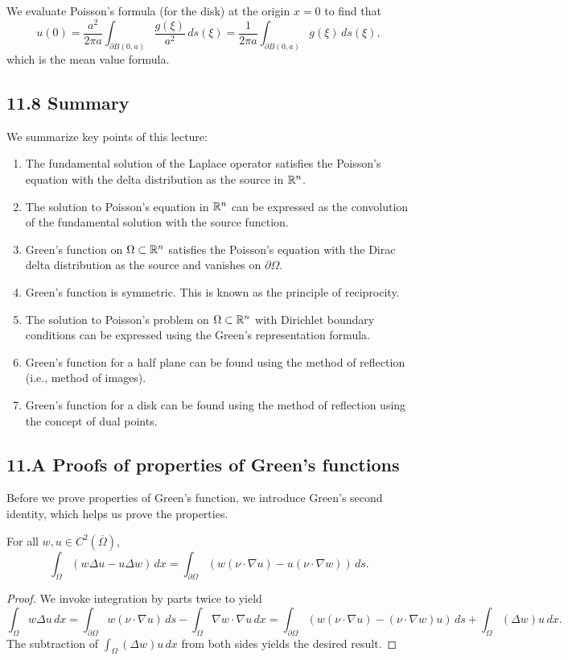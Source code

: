 \begin{example}
    We evaluate Poisson's formula (for the disk) at the origin $x = 0$ to find that
    \[u(0) = \frac{a^2}{2\pi a}\int_{\partial B(0, a)} \frac{g(\xi)}{a^2}\,ds(\xi) = \frac{1}{2\pi a}\int_{\partial B(0, a)} g(\xi)\,ds(\xi),\]
    which is the mean value formula.
\end{example}

\subsection{11.8 Summary}
We summarize key points of this lecture:
\begin{enumerate}
    \item The fundamental solution of the Laplace operator satisfies the Poisson's equation with the delta distribution as the source in $\mathbb{R}^n$.
    \item The solution to Poisson's equation in $\mathbb{R}^n$ can be expressed as the convolution of the fundamental solution with the source function.
    \item Green's function on $\Omega \subset \mathbb{R}^n$ satisfies the Poisson's equation with the Dirac delta distribution as the source and vanishes on $\partial\Omega$.
    \item Green's function is symmetric. This is known as the principle of reciprocity.
    \item The solution to Poisson's problem on $\Omega \subset \mathbb{R}^n$ with Dirichlet boundary conditions can be expressed using the Green's representation formula.
    \item Green's function for a half plane can be found using the method of reflection (i.e., method of images).
    \item Green's function for a disk can be found using the method of reflection using the concept of dual points.
\end{enumerate}

\subsection{11.A Proofs of properties of Green's functions}
Before we prove properties of Green's function, we introduce Green's second identity, which helps us prove the properties.

\begin{proposition}
    For all $w, u \in C^2(\overline{\Omega})$,
    \[\int_\Omega (w\Delta u - u\Delta w)\,dx = \int_{\partial\Omega} (w(\nu \cdot \nabla u) - u(\nu \cdot \nabla w))\,ds.\]
\end{proposition}
\begin{proof}
    We invoke integration by parts twice to yield
    \[\int_\Omega w\Delta u\,dx = \int_{\partial\Omega} w(\nu \cdot \nabla u)\,ds - \int_\Omega \nabla w \cdot \nabla u\,dx = \int_{\partial\Omega} (w(\nu \cdot \nabla u) - (\nu \cdot \nabla w)u)\,ds + \int_\Omega (\Delta w)u\,dx.\]
    The subtraction of $\int_\Omega (\Delta w)u\,dx$ from both sides yields the desired result.
\end{proof}

